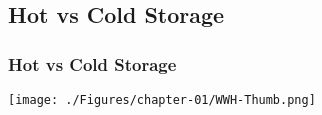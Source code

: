 %
%
%
%
%

\VideoClassification[column=2, colour=red]

\subsection{Hot vs Cold Storage}
\begin{frame}[c]
\frametitle{Hot vs Cold Storage}

\texttt{[image: ./Figures/chapter-01/WWH-Thumb.png]}



\end{frame}


